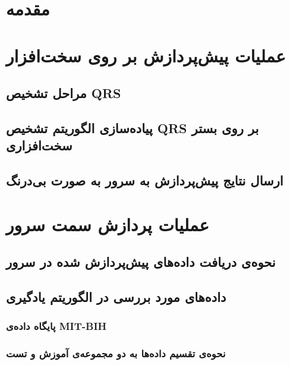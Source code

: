 
\pagebreak

\section{مقدمه}
 

\section{عملیات پیش‌پردازش بر روی سخت‌افزار} 

	\subsection{مراحل تشخیص QRS}

	\subsection{پیاده‌سازی الگوریتم تشخیص QRS بر روی بستر سخت‌افزاری}

	\subsection{ارسال نتایج پیش‌پردازش به سرور به صورت بی‌درنگ}

\section{عملیات پردازش سمت سرور}

	\subsection{نحوه‌ی دریافت داده‌های پیش‌پردازش شده در سرور}

	\subsection{داده‌های مورد بررسی در الگوریتم یادگیری}

		\subsubsection{پایگاه داده‌ی MIT-BIH}

		\subsubsection{نحوه‌ی تقسیم داده‌ها به دو مجموعه‌ی آموزش و تست}


